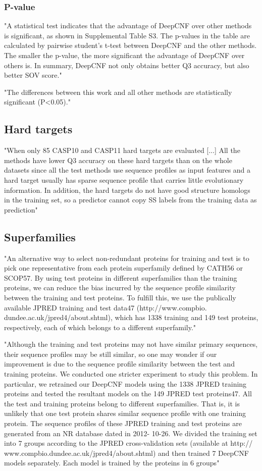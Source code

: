 \documentclass[]{scrartcl}
\begin{document}
\subsubsection{P-value}
"A statistical test indicates that the advantage of DeepCNF over other methods is significant, as shown in Supplemental Table S3. The p-values in the table are calculated by pairwise student’s t-test between DeepCNF and the other methods. The smaller the p-value, the more significant the advantage of DeepCNF over others is. In summary, DeepCNF not only obtains better Q3 accuracy, but also better SOV score." \cite{Wang2016}

"The differences between this work and all other methods are statistically significant (P<0.05)." \cite{Heffernan2017}
\subsection{Hard targets}
"When only 85 CASP10 and CASP11 hard targets are evaluated [...] All the methods have lower Q3 accuracy on these hard targets than on the whole datasets since all the test methods use sequence profiles as input features and a hard target usually has sparse sequence profile that carries little evolutionary information. In addition, the hard targets do not have good structure homologs in the training set, so a predictor cannot copy SS labels from the training data as prediction" \cite{Wang2016}

\subsection{Superfamilies}
"An alternative way to select non-redundant proteins for training and test is to pick one representative from each protein superfamily defined by CATH56 or SCOP57. By using test proteins in different superfamilies than the training proteins, we can reduce the bias incurred by the sequence profile similarity between the training and test proteins. To fulfill this, we use the publically available JPRED training and test data47 (http://www.compbio. dundee.ac.uk/jpred4/about.shtml), which has 1338 training and 149 test proteins, respectively, each of which belongs to a different superfamily." \cite{Wang2016}

"Although the training and test proteins may not have similar primary sequences, their sequence profiles may be still similar, so one may wonder if our improvement is due to the sequence profile similarity between the test and training proteins. We conducted one stricter experiment to study this problem. In particular, we retrained our DeepCNF models using the 1338 JPRED training proteins and tested the resultant models on the 149 JPRED test proteins47. All the test and training proteins belong to different superfamilies. That is, it is unlikely that one test protein shares similar sequence profile with one training protein. The sequence profiles of these JPRED training and test proteins are generated from an NR database dated in 2012- 10-26. We divided the training set into 7 groups according to the JPRED cross-validation sets (available at http:// www.compbio.dundee.ac.uk/jpred4/about.shtml) and then trained 7 DeepCNF models separately. Each model is trained by the proteins in 6 groups" \cite{Wang2016}
\end{document}
